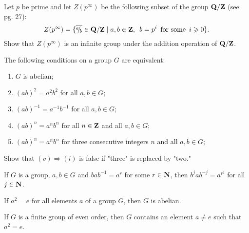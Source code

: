     \begin{exercise}
        Let $p$ be prime and let $Z(p^\infty)$ be the following subset of the group $\bfQ/\bfZ$ (see pg. 27):
            \begin{equation*}
            \begin{split}
                Z(p^\infty) = \{\overline{\sfrac{a}{b}} \in \bfQ/\bfZ \mid a,b \in \bfZ, \h5 b = p^i \h5 \text{for some}\h5 i \geq 0\}.
            \end{split}
            \end{equation*}
        Show that  $Z(p^\infty)$ is an infinite group under the addition operation of $\bfQ/\bfZ$.
    \end{exercise}
    

    \begin{exercise}
        The following conditions on a group $G$ are equivalent:
            \begin{enumerate}[label = (\roman*),itemsep=1pt,topsep=3pt]
                \item $G$ is abelian;
                \item $(ab)^2 = a^2 b^2$ for all $a,b \in G$;
                \item $(ab)^{-1} = a^{-1}b^{-1}$ for all $a,b \in G$;
                \item $(ab)^n = a^n b^n$ for all $n \in \bfZ$ and all $a,b \in G$;
                \item $(ab)^n = a^n b^n$ for three consecutive integers $n$ and all $a,b \in G$;
            \end{enumerate}
        Show that $(v) \Rightarrow (i)$ is false if "three" is replaced by "two."
    \end{exercise}
    
    \begin{exercise}
        If $G$ is a group, $a,b \in G$ and $bab^{-1} = a^r$ for some $r \in \bfN$, then $b^j ab^{-j} = a^{r^j}$ for all $j \in \bfN$. 
    \end{exercise}
    
    \begin{exercise}
        If $a^2 = e$ for all elements $a$ of a group $G$, then $G$ is abelian.
    \end{exercise}
    
    \begin{exercise}
        If $G$ is a finite group of even order, then $G$ contains an element $a \neq e$ such that $a^2 = e$.
    \end{exercise}
    
